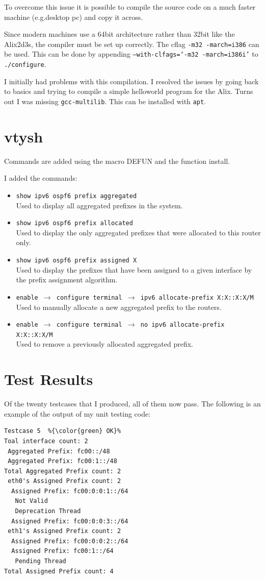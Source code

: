To overcome this issue it is possible to compile the source code on a much
faster machine (e.g.\@ desktop pc) and copy it across. 

Since modern machines use a 64bit architecture rather than 32bit like the
Alix2d3s, the compiler must be set up correctly. The cflag \texttt{-m32
-march=i386} can be used. This can be done by appending
\texttt{--with-clfags=`-m32 -march=i386i'} to \texttt{\@./configure}.

I initially had problems with this compilation. I resolved the issues by going
back to basics and trying to compile a simple helloworld program for the Alix.
Turns out I was missing \texttt{gcc-multilib}. This can be installed with \texttt{apt}.

\chapter{vtysh}
\label{vtysh}
Commands are added using the macro DEFUN and the function install.

I added the commands:
\begin{itemize}
	\item \texttt{show ipv6 ospf6 prefix aggregated} \\
		Used to display all aggregated prefixes in the system.
	\item \texttt{show ipv6 ospf6 prefix allocated} \\ 
		Used to display the only aggregated prefixes that were allocated to this
		router only.
	\item \texttt{show ipv6 ospf6 prefix assigned X} \\
		Used to display the prefixes that have been assigned to a given interface
		by the prefix assignment algorithm. 


	\item \texttt{enable $\rightarrow$ configure terminal 
		$\rightarrow$ ipv6 allocate-prefix X:X::X:X/M} \\
		Used to manually allocate a new aggregated prefix to the routers.
	\item \texttt{enable $\rightarrow$ configure terminal
		$\rightarrow$ no ipv6 allocate-prefix X:X::X:X/M} \\
		Used to remove a previously allocated aggregated prefix.
\end{itemize}

\chapter{Test Results}
\label{testResults}
Of the twenty testcases that I produced, all of them now pass. The following is an
example of the output of my unit testing code: 

\begin{lstlisting}
Testcase 5  %{\color{green} OK}%
Toal interface count: 2 
 Aggregated Prefix: fc00::/48
 Aggregated Prefix: fc00:1::/48
Total Aggregated Prefix count: 2 
 eth0's Assigned Prefix count: 2
  Assigned Prefix: fc00:0:0:1::/64
   Not Valid
   Deprecation Thread
  Assigned Prefix: fc00:0:0:3::/64
 eth1's Assigned Prefix count: 2
  Assigned Prefix: fc00:0:0:2::/64
  Assigned Prefix: fc00:1::/64
   Pending Thread
Total Assigned Prefix count: 4 
\end{lstlisting}
